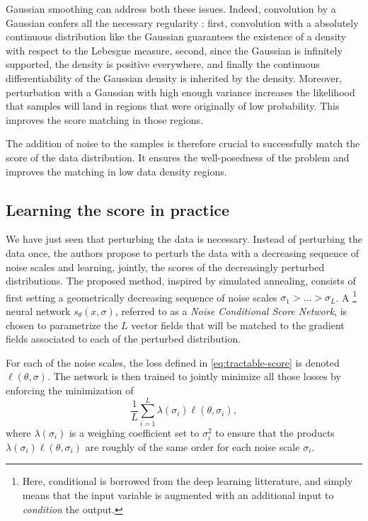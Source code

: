 \documentclass[10pt,journal,a4paper]{IEEEtran}
\theoremstyle{definition}
\begin{document}
Gaussian smoothing can address both these issues. Indeed, convolution by a Gaussian confers all the necessary regularity : first, convolution with a absolutely continuous distribution like the Gaussian guarantees the existence of a density with respect to the Lebesgue measure, second, since the Gaussian is infinitely supported, the density is positive everywhere, and finally the continuous differentiability of the Gaussian density is inherited by the density. Moreover, perturbation with a Gaussian with high enough variance increases the likelihood that samples will land in regions that were originally of low probability. This improves the score matching in those regions.

The addition of noise to the samples is therefore crucial to successfully match the score of the data distribution. It ensures the well-posedness of the problem and improves the matching in low data density regions.

\subsection{Learning the score in practice}

We have just seen that perturbing the data is necessary. Instead of perturbing the data once, the authors propose to perturb the data with a decreasing sequence of noise scales and learning, jointly, the scores of the decreasingly perturbed distributions. The proposed method, inspired by simulated annealing, consists of first setting a geometrically decreasing sequence of noise scales $\sigma_1 > \dots > \sigma_L$. A \footnote{Here, conditional is borrowed from the deep learning litterature, and simply means that the input variable is augmented with an additional input to \textit{condition} the output.} neural network $s_\theta(x, \sigma)$, referred to as a \textit{Noise Conditional Score Network}, is chosen to parametrize the $L$  vector fields that will be matched to the gradient fields associated to each of the perturbed distribution.

For each of the noise scales, the loss defined in \eqref{eq:tractable-score} is denoted $\ell(\theta, \sigma)$. The network is then trained to jointly minimize all those losses by enforcing the minimization of
\[
\frac{1}{L} \sum_{i=1}^{L}\lambda(\sigma_i) \ell(\theta, \sigma_i),
\]
where $\lambda(\sigma_i)$ is a weighing coefficient set to $\sigma_i^2$ to ensure that the products \(\lambda(\sigma_i) \ell(\theta, \sigma_i)\) are roughly of the same order for each noise scale $\sigma_i$. 
\end{document}
